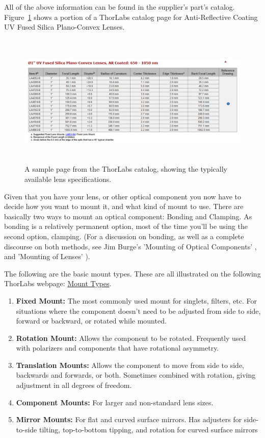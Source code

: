 \documentclass[11pt]{article}
\begin{document}
\hspace{-0.6cm}All of the above information can be found in the supplier's part's catalog. Figure~\ref{fig:CatPage} shows a portion of a ThorLabs catalog page for Anti-Reflective Coating UV Fused Silica Plano-Convex Lenses.

\begin{figure}[!b]
    \centering
    \includegraphics[height=2.5in]{assets/CatPage01.png}
    \caption{A sample page from the ThorLabs catalog, showing the typically available lens specifications.}
    \label{fig:CatPage}
\end{figure}

Given that you have your lens, or other optical component you now have to decide how you want to mount it, and what kind of mount to use. There are basically two ways to mount an optical component: Bonding and Clamping. As bonding is a relatively permanent option, most of the time you'll be using the second option, clamping. (For a discussion on bonding, as well as a complete discourse on both methods, see Jim Burge's 'Mounting of Optical Components' \cite{website:Burge01}, and 'Mounting of Lenses' \cite{website:Burge02}).

The following are the basic mount types. These are all illustrated on the following ThorLabs webpage: \href{https://www.thorlabs.com/navigation.cfm?guide_id=2307}{Mount Types}.

\vspace{10pt}

\begin{enumerate}[noitemsep]
   \item \textbf{Fixed Mount:} The most commonly used mount for singlets, filters, etc. For situations where the component doesn't need to be adjusted from side to side, forward or backward, or rotated while mounted. 
   \item \textbf{Rotation Mount:} Allows the component to be rotated. Frequently used with polarizers and components that have rotational asymmetry.
   \item \textbf{Translation Mounts:} Allows the component to move from side to side, backwards and forwards, or both. Sometimes combined with rotation, giving adjustment in all degrees of freedom.
   \item \textbf{Component Mounts:} For larger and non-standard lens sizes.
   \item \textbf{Mirror Mounts:} For flat and curved surface mirrors. Has adjusters for side-to-side tilting, top-to-bottom tipping, and rotation for curved surface mirrors
\end{enumerate}
\end{document}
